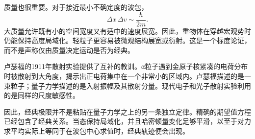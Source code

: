 质量也很重要。对于接近最小不确定度的波包，
\begin{equation}
\Delta x\,\Delta v
\sim
\frac{\hbar}{2m}.
\end{equation}
大质量允许既有小的空间宽度又有适中的速度展宽。因此，重物体在穿越宏观势时仍能保持高度局域化。轻粒子更容易被微观结构展宽或衍射。这是一个标度论证，而不是声称仅由质量决定运动是否为经典。

\begin{classroomqa}
\end{classroomqa}

卢瑟福的1911年散射实验提供了互补的教训。{\proseunicodefont α}粒子遇到金原子核紧凑的电荷分布时被散射到大角度，揭示出正电荷集中在一个非常小的区域内。卢瑟福描述的是一束粒子；量子力学描述的是入射振幅及其散射分量。现代电子和光子散射实验利用的是同样的尺度敏感性。

\begin{classroomqa}
\end{classroomqa}

因此，经典极限并不是粘贴在量子力学之上的另一条独立定律。精确的期望值方程已经包含了经典关系。当态保持局域化，并且哈密顿量变化足够平滑，以至于对力求平均实际上等同于在波包中心求值时，经典轨迹便会出现。
